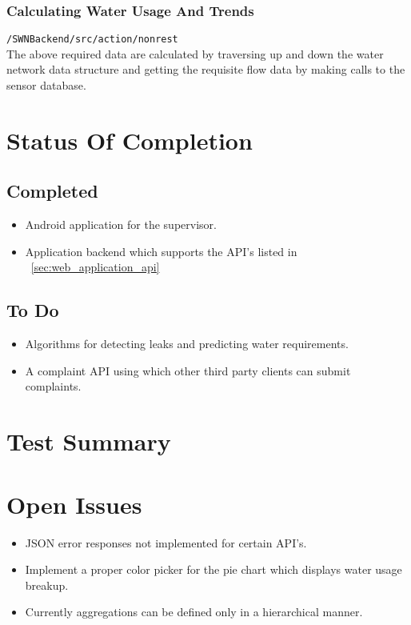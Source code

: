 \documentclass[11pt]{report} %
\begin{document}
\subsection{Calculating Water Usage And Trends}
\texttt{/SWNBackend/src/action/nonrest}
\\
\noindent The above required data are calculated by traversing up and down the water network data structure and getting the requisite flow data by making calls to the sensor database.


\chapter{Status Of Completion}
\section{Completed}
\begin{itemize}
\item Android application for the supervisor.
\item Application backend which supports the API's listed in ~\ref{sec:web_application_api}
\end{itemize}
\section{To Do}
\begin{itemize}
\item Algorithms for detecting leaks and predicting water requirements.
\item A complaint API using which other third party clients can submit complaints.
\end{itemize}


\chapter{Test Summary}


\chapter{Open Issues}
\begin{itemize}
\item JSON error responses not implemented for certain API's.
\item Implement a proper color picker for the pie chart which displays water usage breakup.
\item Currently aggregations can be defined only in a hierarchical manner.
\end{itemize}
\end{document}
